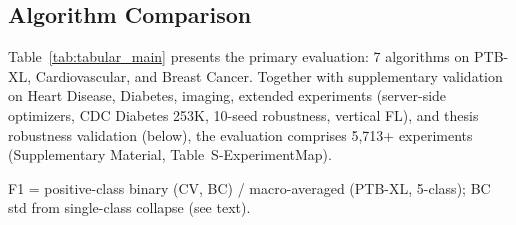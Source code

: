 \documentclass[conference]{IEEEtran}
\begin{document}
\subsection{Algorithm Comparison}

Table~\ref{tab:tabular_main} presents the primary evaluation: 7 algorithms on PTB-XL, Cardiovascular, and Breast Cancer. Together with supplementary validation on Heart Disease, Diabetes, imaging, extended experiments (server-side optimizers, CDC Diabetes 253K, 10-seed robustness, vertical FL), and thesis robustness validation (below), the evaluation comprises 5,713+ experiments (Supplementary Material, Table~S-ExperimentMap).

\begin{table}[htbp]
\centering
\caption{FL Algorithm Comparison on Real Clinical Datasets (7 Algorithms $\times$ 3 Datasets). Best accuracy per dataset in \textbf{bold}. Mean $\pm$ std over 5 seeds. PX = PTB-XL ECG (5 clients, 5-class, site-based), CV = Cardiovascular (5 clients, binary, $\alpha$=0.5), BC = Breast Cancer (3 clients, binary, $\alpha$=0.5).}
\label{tab:tabular_main}
\par{\footnotesize F1 = positive-class binary (CV, BC) / macro-averaged (PTB-XL, 5-class); BC std from single-class collapse (see text).}
\end{table}
\end{document}
